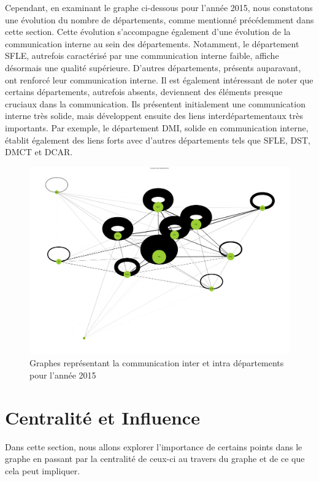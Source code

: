 \documentclass{article}
\begin{document}
Cependant, en examinant le graphe ci-dessous pour l'année 2015, nous constatons une évolution du nombre de départements, comme mentionné précédemment dans cette section. Cette évolution s'accompagne également d'une évolution de la communication interne au sein des départements. Notamment, le département SFLE, autrefois caractérisé par une communication interne faible, affiche désormais une qualité supérieure. D'autres départements, présents auparavant, ont renforcé leur communication interne. Il est également intéressant de noter que certains départements, autrefois absents, deviennent des éléments presque cruciaux dans la communication. Ils présentent initialement une communication interne très solide, mais développent ensuite des liens interdépartementaux très importants. Par exemple, le département DMI, solide en communication interne, établit également des liens forts avec d'autres départements tels que SFLE, DST, DMCT et DCAR.

\begin{figure}[!h]
    \centering
    \includegraphics[width=15cm]{assets/communaute/communaute_communication_2015.png}
    \caption{Graphes représentant la communication inter et intra départements pour l'année 2015}
    \label{fig:communaute_communication_2015}
\end{figure}

\section{Centralité et Influence}

Dans cette section, nous allons explorer l’importance de certains points dans le graphe en passant par la centralité de ceux-ci au travers du graphe et de ce que cela peut impliquer.
\end{document}
